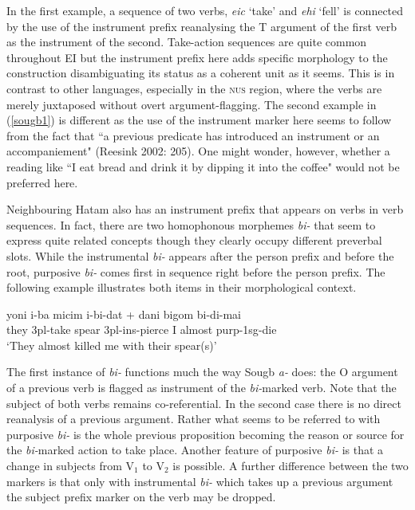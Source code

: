 In the first example, a sequence of two verbs, \textit{eic} `take' and \textit{ehi} `fell' is connected by the use of the instrument prefix reanalysing the T argument of the first verb as the instrument of the second. Take-action sequences are quite common throughout EI but the instrument prefix here adds specific morphology to the construction disambiguating its status as a coherent unit as it seems. This is in contrast to other languages, especially in the \textsc{nus} region, where the verbs are merely juxtaposed without overt argument-flagging. The second example in (\ref{sougb1}) is different as the use of the instrument marker here seems to follow from the fact that ``a previous predicate has introduced an instrument or an accompaniement" (Reesink 2002: 205). One might wonder, however, whether a reading like ``I eat bread and drink it by dipping it into the coffee" would not be preferred here.

Neighbouring Hatam also has an instrument prefix that appears on verbs in verb sequences. In fact, there are two homophonous morphemes \textit{bi-} that seem to express quite related concepts though they clearly occupy different preverbal slots. While the instrumental \textit{bi-} appears after the person prefix and before the root, purposive \textit{bi-} comes first in sequence right before the person prefix. The following example illustrates both items in their morphological context.

\ea 
\gll yoni i-ba micim i-bi-dat + dani bigom bi-di-mai \\
they \acs{3}\acs{pl}-take spear \acs{3}\acs{pl}-\acs{ins}-pierce I almost \acs{purp}-\acs{1}\acs{sg}-die \\
\glft `They almost killed me with their spear(s)' \\ 
\endgl
\xe

The first instance of \textit{bi-} functions much the way Sougb \textit{a-} does: the O argument of a previous verb is flagged as instrument of the \textit{bi-}marked verb. Note that the subject of both verbs remains co-referential. In the second case there is no direct reanalysis of a previous argument. Rather what seems to be referred to with purposive \textit{bi-} is the whole previous proposition becoming the reason or source for the \textit{bi-}marked action to take place. Another feature of purposive \textit{bi-} is that a change in subjects from V$_1$ to V$_2$ is possible. A further difference between the two markers is that only with instrumental \textit{bi-} which takes up a previous argument the subject prefix marker on the verb may be dropped.

